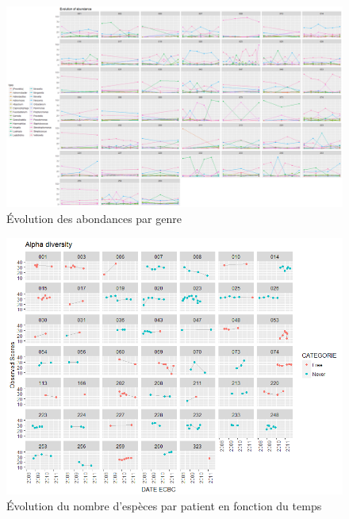 \documentclass[12pt,a4paper]{article}
\begin{document}
{\begin{figure}
\begin{center}
\includegraphics[scale=0.50,angle=90]{img/evolution_abundance.png}\hfill
\end{center}
\caption{Évolution des abondances par genre}
\label{plotabundancecurve}
\end{figure}


\begin{figure}
\begin{center}
\includegraphics[scale=0.80]{img/alpha_observed.png}\hfill
\end{center}
\caption{Évolution du nombre d'espèces par patient en fonction du temps}
\label{alphaObs}
\end{figure}


}
\end{document}
